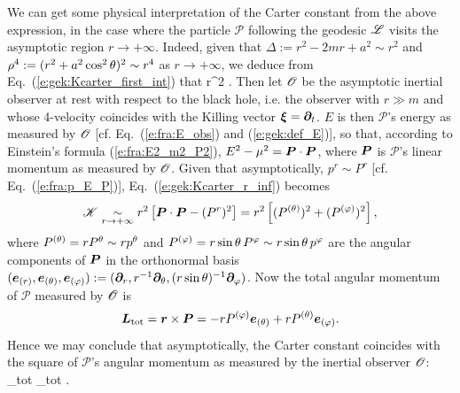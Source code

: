 We can get some physical interpretation of the Carter constant from the above
expression, in the case where the particle $\mathscr{P}$ following the
geodesic $\mathscr{L}$ visits the asymptotic region $r\to+\infty$. Indeed, given
that $\Delta := r^2 - 2m r + a^2 \sim r^2$  and $\rho^4 := (r^2 + a^2\cos^2\theta)^2 \sim r^4$
as $r\to+\infty$, we deduce from Eq.~(\ref{e:gek:Kcarter_first_int})
that
\be \label{e:gek:Kcarter_r_inf}
      r^2 \left[ E^2 - \mu^2 - (p^r)^2 \right] .
\ee
Then let $\mathscr{O}$ be the asymptotic inertial observer at rest with respect to the
black hole, i.e. the observer with $r\gg m$ and whose 4-velocity
coincides with the Killing vector
$\bm{\xi} = \bm{\partial}_t$. $E$ is then $\mathscr{P}$'s energy as measured by $\mathscr{O}$
[cf. Eq.~(\ref{e:fra:E_obs}) and (\ref{e:gek:def_E})], so that, according to
Einstein's formula (\ref{e:fra:E2_m2_P2}), $E^2 - \mu^2 = \bm{P}\cdot\bm{P}$, where
$\bm{P}$ is $\mathscr{P}$'s linear momentum as measured by $\mathscr{O}$. Given
that asymptotically, $p^r\sim P^r$ [cf. Eq.~(\ref{e:fra:p_E_P})],
Eq.~(\ref{e:gek:Kcarter_r_inf}) becomes
\[
    \mathscr{K} \underset{r\to + \infty}{\sim} r^2 \left[ \bm{P}\cdot\bm{P} - (P^r)^2 \right]
    = r^2 \left[ (P^{(\theta)})^2 + (P^{(\varphi)})^2 \right],
\]
where $P^{(\theta)} = r P^\theta \sim r p^\theta$ and $P^{(\varphi)} = r\sin\theta\, P^\varphi \sim r\sin\theta\, p^\varphi$
are the angular components of $\bm{P}$ in the
orthonormal basis $(\bm{e}_{(r)}, \bm{e}_{(\theta)}, \bm{e}_{(\varphi)}) := (\bm{\partial}_r, r^{-1} \bm{\partial}_\theta,
(r\sin\theta)^{-1}\bm{\partial}_\varphi)$.
Now the total angular momentum of $\mathscr{P}$ measured by $\mathscr{O}$ is
\[
    \bm{L}_{\rm tot} = \bm{r} \times \bm{P} = - r P^{(\varphi)} \bm{e}_{(\theta)}
        + r P^{(\theta)} \bm{e}_{(\varphi)} .
\]
Hence we may conclude that asymptotically, the Carter constant coincides with
the square of $\mathscr{P}$'s angular momentum as measured by the inertial observer $\mathscr{O}$:
\be \label{e:gek:Kcarter_asymptot}
      _{\rm tot} \cdot {}_{\rm tot} .
\ee

